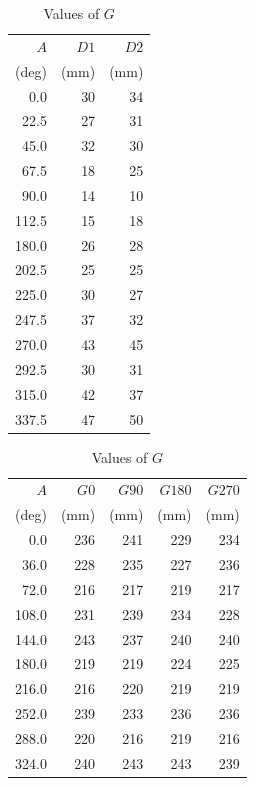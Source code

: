 \documentclass{article}
\begin{document}
\begin{table}
    \centering

    \caption{Values of $D1$ and $D2$}
    \label{table:D}
    \medskip
    \begin{tabular}{rrr}
        \toprule
        $A$&$D1$&$D2$\\
        (deg)&(mm)&(mm)\\
        \midrule
        0.0&30&34\\
        22.5&27&31\\
        45.0&32&30\\
        67.5&18&25\\
        90.0&14&10\\
        112.5&15&18\\
        180.0&26&28\\
        202.5&25&25\\
        225.0&30&27\\
        247.5&37&32\\
        270.0&43&45\\
        292.5&30&31\\
        315.0&42&37\\
        337.5&47&50\\
        \bottomrule
    \end{tabular}

    \vspace{\floatsep}

    \caption{Values of $G$}
    \label{table:G}
    \medskip
    \begin{tabular}{rrrrr}
        \toprule
        $A$&$G0$&$G90$&$G180$&$G270$\\
        (deg)&(mm)&(mm)&(mm)&(mm)\\
        \midrule
        0.0&236&241&229&234\\
        36.0&228&235&227&236\\
        72.0&216&217&219&217\\
        108.0&231&239&234&228\\
        144.0&243&237&240&240\\
        180.0&219&219&224&225\\
        216.0&216&220&219&219\\
        252.0&239&233&236&236\\
        288.0&220&216&219&216\\
        324.0&240&243&243&239\\
        \bottomrule
    \end{tabular}
\end{table}
\end{document}
